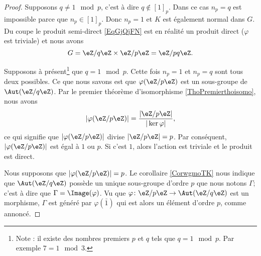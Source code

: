 \begin{proof}
    Supposons \( q\neq 1\mod p\), c'est à dire \( q\notin [1]_p\). Dans ce cas \( n_p=q\) est impossible parce que \( n_p\in [1]_p\). Donc \( n_p=1\) et \( K\) est également normal dans \( G\). Du coupe le produit semi-direct \eqref{EqGjQjFN} est en réalité un produit direct (\( \varphi\) est triviale) et nous avons
    \begin{equation}
        G=\eZ/q\eZ\times \eZ/p\eZ=\eZ/pq\eZ.
    \end{equation}
    
    Supposons à présent\footnote{Note : il existe des nombres premiers \( p\) et \( q\) tels que \( q=1\mod p\). Par exemple \( 7=1\mod 3\).} que \( q=1\mod p\). Cette fois \( n_p=1\) et \( n_p=q\) sont tous deux possibles. Ce que nous savons est que \( \varphi(\eZ/p\eZ)\) est un sous-groupe de \( \Aut(\eZ/q\eZ)\). Par le premier théorème d'isomorphisme \ref{ThoPremierthoisomo}, nous avons
    \begin{equation}
        | \varphi(\eZ/p\eZ) |=\frac{ | \eZ/p\eZ | }{ | \ker\varphi | },
    \end{equation}
    ce qui signifie que \( | \varphi(\eZ/p\eZ) |\) divise \( | \eZ/p\eZ |=p\). Par conséquent, \( | \varphi(\eZ/p\eZ) |\) est égal à \( 1\) ou \( p\). Si c'est \( 1\), alors l'action est triviale et le produit est direct.

    Nous supposons que \( | \varphi(\eZ/p\eZ) |=p\). Le corollaire \ref{CorwgmoTK} nous indique que \( \Aut(\eZ/q\eZ)\) possède un unique sous-groupe d'ordre \( p\) que nous notons \( \Gamma\); c'est à dire que \( \Gamma=\Image(\varphi)\). Vu que \( \varphi\colon \eZ/p\eZ\to \Aut(\eZ/q\eZ)\) est un morphisme, \( \Gamma\) est généré par \( \varphi(\bar 1)\) qui est alors un élément d'ordre \( p\), comme annoncé.


\end{proof}
